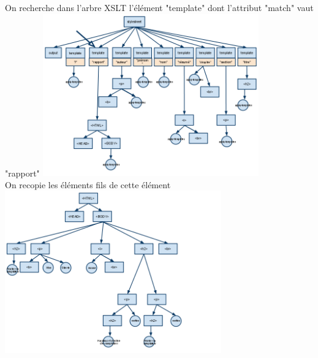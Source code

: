 	On recherche dans l'arbre XSLT l'élément "template" dont l'attribut "match" vaut "rapport"
	\includegraphics[width=0.7\textwidth]{img/XSLTa}\\
	On recopie les éléments fils de cette élément 
	\includegraphics[width=0.7\textwidth]{img/ArbreHTML}\\